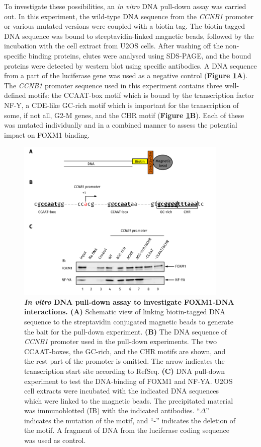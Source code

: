 To investigate these possibilities, an \textit{in vitro} DNA pull-down assay was carried out. In this experiment, the wild-type DNA sequence from the \textit{CCNB1} promoter or various mutated versions were coupled with a biotin tag. The biotin-tagged DNA sequence was bound to streptavidin-linked magnetic beads, followed by the incubation with the cell extract from U2OS cells. After washing off the non-specific binding proteins, elutes were analysed using SDS-PAGE, and the bound proteins were detected by western blot using specific antibodies. A DNA sequence from a part of the luciferase gene was used as a negative control (\textbf{Figure \ref{fig:fig25}A}). The \textit{CCNB1} promoter sequence used in this experiment contains three well-defined motifs: the CCAAT-box motif which is bound by the transcription factor NF-Y, a CDE-like GC-rich motif which is important for the transcription of some, if not all, G2-M genes, and the CHR motif (\textbf{Figure \ref{fig:fig25}B}). Each of these was mutated individually and in a combined manner to assess the potential impact on FOXM1 binding.

\begin{figure}[!h]
    \centering
    \includegraphics[width=0.9\textwidth]{chapter3/figures_foxm1/fig25.pdf}
    \caption[\textit{In vitro} DNA pull-down assay to investigate FOXM1-DNA interactions]{\textbf{\textit{In vitro} DNA pull-down assay to investigate FOXM1-DNA interactions. (A)} Schematic view of linking biotin-tagged DNA sequence to the streptavidin conjugated magnetic beads to generate the bait for the pull-down experiment. \textbf{(B)} The DNA sequence of \textit{CCNB1} promoter used in the pull-down experiments. The two CCAAT-boxes, the GC-rich, and the CHR motifs are shown, and the rest part of the promoter is omitted. The arrow indicates the transcription start site according to RefSeq. \textbf{(C)} DNA pull-down experiment to test the DNA-binding of FOXM1 and NF-YA. U2OS cell extracts were incubated with the indicated DNA sequences which were linked to the magnetic beads. The precipitated material was immunoblotted (IB) with the indicated antibodies. \enquote{$\Delta$} indicates the mutation of the motif, and \enquote{-} indicates the deletion of the motif. A fragment of DNA from the luciferase coding sequence was used as control.}
    \label{fig:fig25}
\end{figure}

